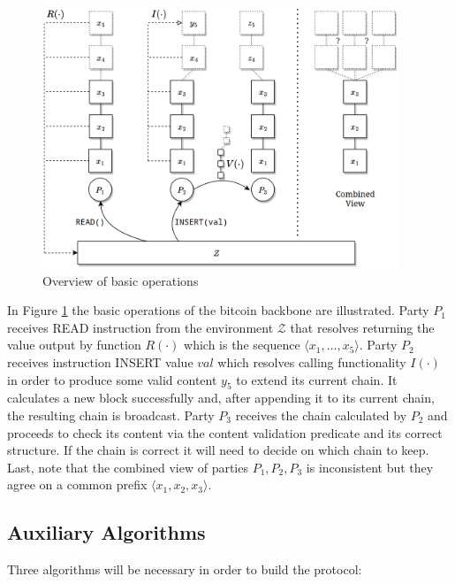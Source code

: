 \documentclass[..]{subfiles}
\begin{document}
\begin{figure}
	\begin{center}
		\includegraphics[width=0.95\textwidth]{figures/example.png}
	\end{center}
	\caption{Overview of basic operations}
	\label{fig:example}
\end{figure}

In Figure \ref{fig:example} the basic operations of the bitcoin backbone are illustrated. Party $P_1$ receives READ instruction from the environment $\mathcal{Z}$ that resolves returning the value output by function $R(\cdot)$ which is the sequence $\langle x_1, \dots, x_5 \rangle$. Party $P_2$ receives instruction INSERT value $val$ which resolves calling functionality $I(\cdot)$ in order to produce some valid content $y_5$ to extend its current chain. It calculates a new block successfully and, after appending it to its current chain, the resulting chain is broadcast. Party $P_3$ receives the chain calculated by $P_2$ and proceeds to check its content via the content validation predicate and its correct structure. If the chain is correct it will need to decide on which chain to keep. Last, note that the combined view of parties $P_1, P_2, P_3$ is inconsistent but they agree on a common prefix $\langle x_1, x_2, x_3 \rangle$.

\subsection{Auxiliary Algorithms}

Three algorithms will be necessary in order to build the protocol:
\end{document}
